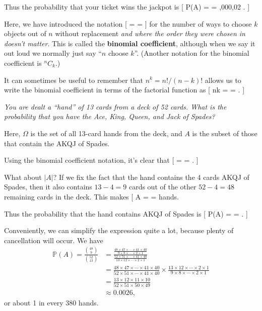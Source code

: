 \documentclass[
  letterpaper,
  DIV=11,
  numbers=noendperiod]{scrreprt}
\theoremstyle{remark}
\begin{document}
Thus the probability that your ticket wins the jackpot is {[}
\mathbb P(A) =  = 
\approx {} ,000,02 . {]}

Here, we have introduced the notation {[}  =
 =
 {]} for the number of
ways to choose \(k\) objects out of \(n\) without replacement \emph{and
where the order they were chosen in doesn't matter}. This is called the
\textbf{binomial coefficient}, although when we say it out loud we
normally just say ``\(n\) choose \(k\)''. (Another notation for the
binomial coefficient is \({}^n C_k\).)

It can sometimes be useful to remember that
\({n}^{\underline{k}} = n!/(n-k)!\) allows us to write the binomial
coefficient in terms of the factorial function as {[} \binom nk =
 =  . {]}

\leavevmode{}%
\emph{You are dealt a ``hand'' of 13 cards from a deck of 52 cards. What
is the probability that you have the Ace, King, Queen, and Jack of
Spades?}

Here, \(\Omega\) is the set of all 13-card hands from the deck, and
\(A\) is the subset of those that contain the AKQJ of Spades.

Using the binomial coefficient notation, it's clear that {[}
\textbar{}\Omega\textbar{} =  =
. {]}

What about \(|A|\)? If we fix the fact that the hand contains the 4
cards AKQJ of Spades, then it also contains \(13-4=9\) cards out of the
other \(52-4 = 48\) remaining cards in the deck. This makes {[}
\textbar A\textbar{} =  =
\frac{48\times47\times\cdots\times41\times40}{9\times8\times\cdots\times2\times1}{]}
hands.

Thus the probability that the hand contains AKQJ of Spades is {[}
\mathbb P(A) =  =
 . {]}

Conveniently, we can simplify the expression quite a lot, because plenty
of cancellation will occur. We have \begin{align*}
\mathbb P(A) = \frac{\binom{48}{9}}{\binom{52}{13}}
  &= \frac{\frac{48\times47\times\cdots\times41\times40}{9\times8\times\cdots\times2\times1}}{\frac{52\times51\times\cdots\times41\times40}{13\times12\times\cdots\times2\times1}} \\
  &= \frac{48\times47\times\cdots\times41\times40}{52\times51\times\cdots\times41\times40} \times \frac{13\times12\times\cdots\times2\times1}{9\times8\times\cdots\times2\times1} \\
  &= \frac{13\times12\times11\times10}{52\times51\times50\times49} \\
  &\approx 0.0026 ,
\end{align*} or about 1 in every 380 hands.
\end{document}
